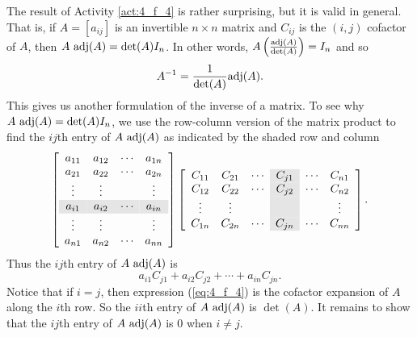 The result of Activity \ref{act:4_f_4} is rather surprising, but it is valid in general. That is, if $A = [a_{ij}]$ is an invertible $n \times n$ matrix and $C_{ij}$ is the $(i,j)$ cofactor of $A$, then $A \ \text{adj}(A)=\det(A) I_n$. In other words, $A \left(\frac{\text{adj}(A)}{\det(A)}\right) = I_n$ and so 
\[A^{-1} = \frac{1}{\det(A)} \text{adj}(A).\]
This gives us another formulation of the inverse of a matrix. To see why $A \ \text{adj}(A) = \det(A) I_n$, we use the row-column version of the matrix product to find the $ij$th entry of $A \ \text{adj}(A)$ as indicated by the shaded row and column 
\[\left[ \begin{array}{cccc}
a_{11} 		& a_{12} 	& \cdots   & a_{1n} \\
a_{21} 		&a_{22}		& \cdots  & a_{2n} \\
\vdots 		& \vdots      &           &\vdots  \\
\rowcolor{Gray}
a_{i1}  		&a_{i2} 		& \cdots   & a_{in} \\
\vdots 		& \vdots      &           &\vdots  \\
a_{n1} 		& a_{n2} 	& \cdots   &a_{nn}
\end{array} \right] \left[ \begin{array}{ccc>{\columncolor{Gray}}ccc}
C_{11} 	& C_{21} & \cdots    &C_{j1} &\cdots & C_{n1} \\
C_{12} 	& C_{22} & \cdots    &C_{j2} &\cdots & C_{n2} \\
\vdots 	&  \vdots  & 		    &           &			 & \vdots \\
C_{1n} 	& C_{2n} & \cdots    &C_{jn} &\cdots & C_{nn} 
\end{array} \right]. \]
Thus the $ij$th entry of $A \ \text{adj}(A)$ is 
\begin{equation} \label{eq:4_f_4}
a_{i1}C_{j1} + a_{i2}C_{j2} + \cdots + a_{in}C_{jn}.
\end{equation}
Notice that if $i=j$, then expression (\ref{eq:4_f_4}) is the cofactor expansion of $A$ along the $i$th row. So the $ii$th entry of $A \ \text{adj}(A)$ is $\det(A)$. It remains to show that the $ij$th entry of $A \ \text{adj}(A)$ is 0 when $i \neq j$. 


